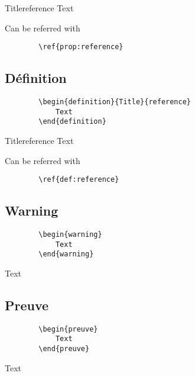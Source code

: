 \documentclass[french]{article}
\begin{document}
    \begin{propriete}{Title}{reference}
        Text
    \end{propriete}

    Can be referred with 
    \begin{verbatim} 
        \ref{prop:reference}
    \end{verbatim}

    \subsection{Définition}
    \begin{verbatim}
        \begin{definition}{Title}{reference}
            Text
        \end{definition}
    \end{verbatim}

    \begin{definition}{Title}{reference}
        Text
    \end{definition}

    Can be referred with 
    \begin{verbatim} 
        \ref{def:reference}
    \end{verbatim}

    \subsection{Warning}

    \begin{verbatim}
        \begin{warning}
            Text
        \end{warning}
    \end{verbatim}

    \begin{warning}
        Text
    \end{warning}

    \subsection{Preuve}

    \begin{verbatim}
        \begin{preuve}
            Text
        \end{preuve}
    \end{verbatim}

    \begin{preuve}
        Text
    \end{preuve}
\end{document}
